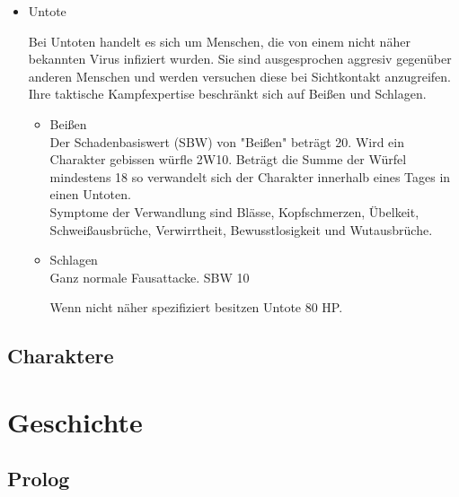 \documentclass{include/protokollclass}
\newcommand{\gqm}[1]{\glqq#1\grqq}
\begin{document}
\begin{itemize}
  \item Untote

Bei Untoten handelt es sich um Menschen, die von einem nicht näher bekannten Virus infiziert wurden. Sie sind ausgesprochen aggresiv gegenüber anderen Menschen und werden versuchen diese bei Sichtkontakt anzugreifen. Ihre taktische Kampfexpertise beschränkt sich auf \gqm{Beißen} und \gqm{Schlagen}.

\begin{itemize}
  \item Beißen
  \\Der Schadenbasiswert (SBW) von "Beißen" beträgt 20. Wird ein Charakter gebissen würfle 2W10. Beträgt die Summe der Würfel mindestens 18 so verwandelt sich der Charakter innerhalb eines Tages in einen Untoten.
  \\Symptome der Verwandlung sind Blässe, Kopfschmerzen, Übelkeit, Schweißausbrüche, Verwirrtheit, Bewusstlosigkeit und Wutausbrüche.
  \item Schlagen
  \\Ganz normale Fausattacke. SBW 10

  Wenn nicht näher spezifiziert besitzen Untote 80 HP.

\end{itemize}
\end{itemize}
\newpage
\section{Charaktere}


\chapter{Geschichte}

\section{Prolog}
\end{document}
